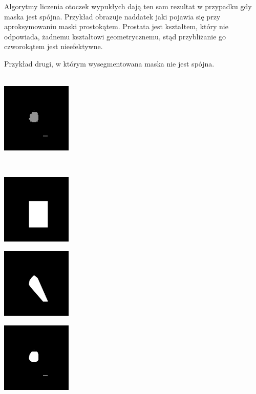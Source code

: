 \documentclass[a4paper,11pt,twoside]{report}
\theoremstyle{definition}
\begin{document}
Algorytmy liczenia otoczek wypukłych dają ten sam rezultat w przypadku gdy maska jest spójna. Przykład obrazuje naddatek jaki pojawia się przy aproksymowaniu maski prostokątem. Prostata jest kształtem, który nie odpowiada, żadnemu kształtowi geometrycznemu, stąd przybliżanie go czworokątem jest nieefektywne.

Przykład drugi, w którym wysegmentowana maska nie jest spójna. \\ \\
\begin{minipage}{\linewidth}
	\centering
	\includegraphics[width=0.25\textwidth]{Mask/2/mask.png}
\end{minipage}
\\
\begin{minipage}{\linewidth}
	\centering
	\includegraphics[width=0.25\textwidth]{Mask/2/square.png}
\end{minipage}
\begin{minipage}{\linewidth}
	\centering
	\includegraphics[width=0.25\textwidth]{Mask/2/biggest.png}
\end{minipage}
\begin{minipage}{\linewidth}
	\centering
	\includegraphics[width=0.25\textwidth]{Mask/2/hull.png}
\end{minipage}
\end{document}
